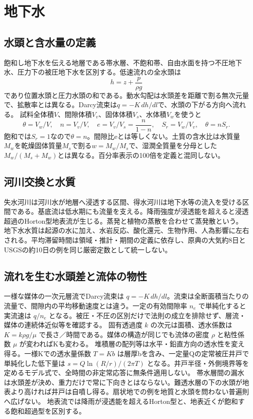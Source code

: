 \chapter{地下水}
\section{水頭と含水量の定義}\label{theory:hydro:definitions}
飽和し地下水を伝える地層である帯水層、不飽和帯、自由水面を持つ不圧地下水、圧力下の被圧地下水を区別する。低速流れの全水頭は
\[h=z+\frac{p}{\rho g}\]
であり位置水頭と圧力水頭の和である。動水勾配は水頭差を距離で割る無次元量で、拡散率とは異なる。Darcy流束は\(q=-K\,dh/dl\)で、水頭の下がる方向へ流れる。\cite{inorganic_hydro_ref}
試料全体積\(V\)、間隙体積\(V_v\)、固体体積\(V_s\)、水体積\(V_w\)を使うと
\[\theta=V_w/V,\quad n=V_v/V,\quad e=V_v/V_s=\frac{n}{1-n},\quad S_r=V_w/V_v,\quad\theta=nS_r.\]
飽和では\(S_r=1\)なので\(\theta=n\)。間隙比eとは等しくない。土質の含水比は水質量\(M_w\)を乾燥固体質量\(M_s\)で割る\(w=M_w/M_s\)で、湿潤全質量を分母とした\(M_w/(M_s+M_w)\)とは異なる。百分率表示の100倍を定義と混同しない。
\section{河川交換と水質}
失水河川は河川水が地層へ浸透する区間、得水河川は地下水等の流入を受ける区間である。基底流は低水期にも流量を支える。降雨強度が浸透能を超えると浸透超過のHorton型地表流が生じる。蒸発と植物の蒸散を合わせて蒸発散という。
地下水水質は起源の水に加え、水岩反応、酸化還元、生物作用、人為影響に左右される。平均滞留時間は領域・推計・期間の定義に依存し、原典の大気約8日とUSGSの約10日の例を同じ厳密定数として統一しない。\cite{inorganic_waterchem,inorganic_waterbudget}
\section{流れを生む水頭差と流体の物性}\label{theory:hydro:flow}
一様な媒体の一次元層流でDarcy流束は \(q=-K\,dh/dl\)。流束は全断面積当たりの流量で、間隙内の平均移動速度とは違う。一定の有効間隙率 \(n_e\) で単純化すると実流速は \(q/n_e\) となる。被圧・不圧の区別だけで法則の成立を排除せず、層流・媒体の連続体近似等を確認する。
固有透過度 \(k\) の次元は面積、透水係数は \(K=k\rho g/\mu\) で長さ／時間である。媒体の構造が同じでも流体の密度 \(\rho\) と粘性係数 \(\mu\) が変わればKも変わる\cite{analysis49_darcy_ref}。
堆積層の配列等は水平・鉛直方向の透水性を変え得る。一様Kでの透水量係数 \(T=Kb\) は層厚bを含み、一定量Qの定常被圧井戸で単純化した低下量は \(s=Q\ln(R/r)/(2\pi T)\) となる。井戸半径・外側境界等を定めるモデル式で、全時間の非定常応答に無条件適用しない。
帯水層間の漏水は水頭差が決め、重力だけで常に下向きとはならない。難透水層の下の水頭が地表より高ければ井戸は自噴し得る。扇状地での例を地質と水頭を問わない普遍則へ広げない。
地表流では降雨が浸透能を超えるHorton型と、地表近くが飽和する飽和超過型を区別する\cite{analysis49_runoff_ref}。

